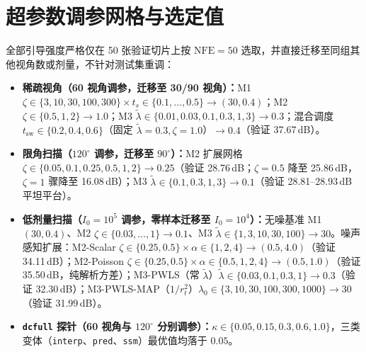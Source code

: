 \documentclass[11pt,UTF8]{ctexart}
\begin{document}
\section{超参数调参网格与选定值}
\label{app:tuning_zh}
全部引导强度严格仅在 50 张验证切片上按 $\mathrm{NFE}{=}50$ 选取，并直接迁移至同组其他视角数或剂量，不针对测试集重调：
\begin{itemize}[leftmargin=*,nosep]
  \item \textbf{稀疏视角（60 视角调参，迁移至 30/90 视角）：}M1 $\zeta\in\{3,10,30,100,300\}\times t_s\in\{0.1,\dots,0.5\}\to(30,0.4)$；M2 $\zeta\in\{0.5,1,2\}\to 1.0$；M3 $\tilde\lambda\in\{0.01,0.03,0.1,0.3,1,3\}\to 0.3$；混合调度 $t_{\mathrm{sw}}\in\{0.2,0.4,0.6\}$（固定 $\tilde\lambda{=}0.3,\zeta{=}1.0$）$\to 0.4$（验证 37.67\,dB）。
  \item \textbf{限角扫描（$120^\circ$ 调参，迁移至 $90^\circ$）：}M2 扩展网格 $\zeta\in\{0.05,0.1,0.25,0.5,1,2\}\to 0.25$（验证 28.76\,dB；$\zeta{=}0.5$ 降至 25.86\,dB，$\zeta{=}1$ 骤降至 16.08\,dB）；M3 $\tilde\lambda\in\{0.1,0.3,1,3\}\to 0.1$（验证 28.81--28.93\,dB 平坦平台）。
  \item \textbf{低剂量扫描（$I_0{=}10^5$ 调参，零样本迁移至 $I_0{=}10^4$）：}无噪基准 M1 $(30,0.4)$、M2 $\zeta\in\{0.03,\dots,1\}\to 0.1$、M3 $\tilde\lambda\in\{1,3,10,30,100\}\to 30$。噪声感知扩展：M2-Scalar $\zeta\in\{0.25,0.5\}\times\alpha\in\{1,2,4\}\to(0.5,4.0)$（验证 34.11\,dB）；M2-Poisson $\zeta\in\{0.25,0.5\}\times\alpha\in\{0.5,1,2,4\}\to(0.5,1.0)$（验证 35.50\,dB，纯解析方差）；M3-PWLS（常 $\tilde\lambda$）$\tilde\lambda\in\{0.03,0.1,0.3,1\}\to 0.3$（验证 32.30\,dB）；M3-PWLS-MAP（$1/r_t^2$）$\lambda_0\in\{3,10,30,100,300,1000\}\to 30$（验证 31.99\,dB）。
  \item \textbf{\texttt{dcfull} 探针（60 视角与 $120^\circ$ 分别调参）：}$\kappa\in\{0.05,0.15,0.3,0.6,1.0\}$，三类变体（\texttt{interp}、\texttt{pred}、\texttt{ssm}）最优值均落于 $0.05$。
\end{itemize}



\end{document}
